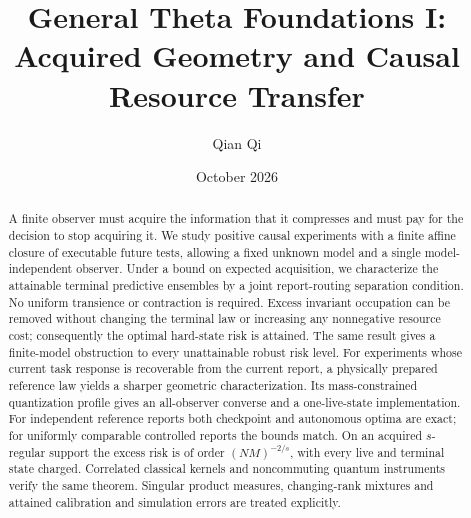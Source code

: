 \documentclass[11pt,reqno]{amsart}
\title[Acquired geometry and causal resource transfer]{General Theta Foundations I:\\Acquired Geometry and Causal Resource Transfer}
\author{Qian Qi}
\date{October 2026}
\numberwithin{equation}{section}
\theoremstyle{definition}
\theoremstyle{remark}
\begin{document}
\begin{abstract}
A finite observer must acquire the information that it compresses and must pay for the decision to stop acquiring it. We study positive causal experiments with a finite affine closure of executable future tests, allowing a fixed unknown model and a single model-independent observer. Under a bound on expected acquisition, we characterize the attainable terminal predictive ensembles by a joint report-routing separation condition. No uniform transience or contraction is required. Excess invariant occupation can be removed without changing the terminal law or increasing any nonnegative resource cost; consequently the optimal hard-state risk is attained. The same result gives a finite-model obstruction to every unattainable robust risk level. For experiments whose current task response is recoverable from the current report, a physically prepared reference law yields a sharper geometric characterization. Its mass-constrained quantization profile gives an all-observer converse and a one-live-state implementation. For independent reference reports both checkpoint and autonomous optima are exact; for uniformly comparable controlled reports the bounds match. On an acquired $s$-regular support the excess risk is of order $(NM)^{-2/s}$, with every live and terminal state charged. Correlated classical kernels and noncommuting quantum instruments verify the same theorem. Singular product measures, changing-rank mixtures and attained calibration and simulation errors are treated explicitly.
\end{abstract}
\maketitle








\appendix




\end{document}
